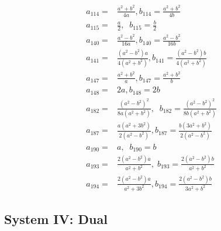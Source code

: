 \begin{align*}
a_{114}=& \frac{a^2+b^2}{4a}, 	b_{114}= \frac{a^2+b^2}{4b}\\
a_{115}=& \frac{a }{2}, 	\;\; b_{115}= \frac{b}{2}\\
a_{140}=& \frac{a^2-b^2}{16a}, 	b_{140}= \frac{a^2-b^2}{16b}\\
a_{141}=&\frac{(a^2-b^2)a}{4(a^2+b^2)},
b_{141}= \frac{(a^2-b^2)b}{4(a^2+b^2)}\\
a_{147}=&\frac{a^2+b^2}{a},
					b_{147}= \frac{a^2+b^2}{b}\\
					a_{148}=&2{a},
					b_{148}=2b\\
		a_{182}=&\frac{(a^2-b^2)^2}{8a(a^2+b^2)},\;\;
					b_{182}= \frac{(a^2-b^2)^2}{8b(a^2+b^2)}\\
					a_{187}=& \frac{a(a^2+3b^2)}{2(a^2-b^2)},
						b_{187}=  \frac{b(3a^2+b^2)}{2(a^2-b^2)}\\
						a_{190}=& a,\;\; b_{190}=b\\
		a_{193}=&\frac{2(a^2-b^2)a}{a^2+b^2},\;
		b_{193}=\frac{2(a^2-b^2)b}{a^2+b^2}\\
		a_{194}=&\frac{2(a^2-b^2)a}{a^2+3b^2},
		b_{194}=\frac{2(a^2-b^2)b}{3a^2+b^2}				
\end{align*}

\subsection{System IV: Dual}

